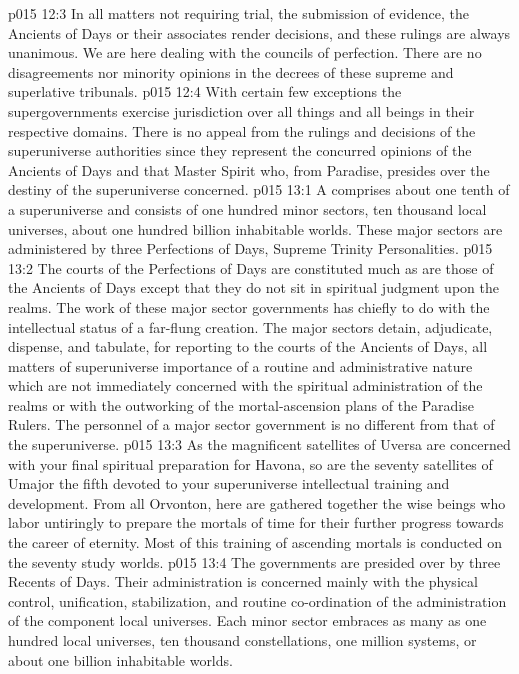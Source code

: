 \vs p015 12:3 In all matters not requiring trial, the submission of evidence, the Ancients of Days or their associates render decisions, and these rulings are always unanimous. We are here dealing with the councils of perfection. There are no disagreements nor minority opinions in the decrees of these supreme and superlative tribunals.
\vs p015 12:4 With certain few exceptions the supergovernments exercise jurisdiction over all things and all beings in their respective domains. There is no appeal from the rulings and decisions of the superuniverse authorities since they represent the concurred opinions of the Ancients of Days and that Master Spirit who, from Paradise, presides over the destiny of the superuniverse concerned.
\vs p015 13:1 A  comprises about one tenth of a superuniverse and consists of one hundred minor sectors, ten thousand local universes, about one hundred billion inhabitable worlds. These major sectors are administered by three Perfections of Days, Supreme Trinity Personalities.
\vs p015 13:2 The courts of the Perfections of Days are constituted much as are those of the Ancients of Days except that they do not sit in spiritual judgment upon the realms. The work of these major sector governments has chiefly to do with the intellectual status of a far\hyp{}flung creation. The major sectors detain, adjudicate, dispense, and tabulate, for reporting to the courts of the Ancients of Days, all matters of superuniverse importance of a routine and administrative nature which are not immediately concerned with the spiritual administration of the realms or with the outworking of the mortal\hyp{}ascension plans of the Paradise Rulers. The personnel of a major sector government is no different from that of the superuniverse.
\vs p015 13:3 As the magnificent satellites of Uversa are concerned with your final spiritual preparation for Havona, so are the seventy satellites of Umajor the fifth devoted to your superuniverse intellectual training and development. From all Orvonton, here are gathered together the wise beings who labor untiringly to prepare the mortals of time for their further progress towards the career of eternity. Most of this training of ascending mortals is conducted on the seventy study worlds.
\vs p015 13:4 \pc The  governments are presided over by three Recents of Days. Their administration is concerned mainly with the physical control, unification, stabilization, and routine co\hyp{}ordination of the administration of the component local universes. Each minor sector embraces as many as one hundred local universes, ten thousand constellations, one million systems, or about one billion inhabitable worlds.
